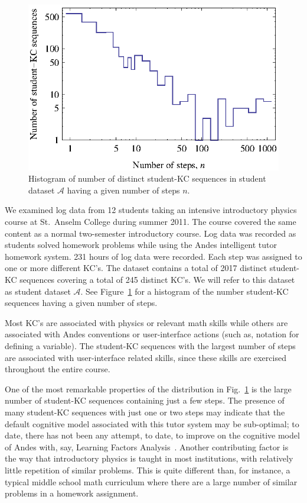 \documentclass{edm_template}
\begin{document}
\begin{figure}
  \centering \includegraphics{student-kc-length-histogram.eps}
  \caption{Histogram of number of distinct student-KC sequences in student 
    dataset $\mathcal{A}$ having a given number of steps $n$.}
    \label{student-length-histogram}
\end{figure}

We examined log data from 12 students taking an intensive introductory
physics course at St.\ Anselm College during summer 2011.  The course
covered the same content as a normal two-semester introductory course.
Log data was recorded as students solved homework problems while using
the Andes intelligent tutor homework system.  231 hours of log data
were recorded.
Each step was assigned to one or more different KC's.  The dataset
contains a total of 2017 distinct student-KC sequences covering a total of
245 distinct KC's.  We will refer to this dataset as student dataset
$\mathcal{A}$.  See Figure~\ref{student-length-histogram} for a
histogram of the number student-KC sequences having a given number of
steps.

Most KC's are associated with physics
or relevant math skills while others are associated with 
Andes conventions or user-interface actions (such as, notation
for defining a variable).  The student-KC sequences with the largest 
number of steps are associated with user-interface related skills,
since these skills are exercised throughout the entire course. 

One of the most remarkable properties of the distribution in
Fig.~\ref{student-length-histogram} is the large number of
student-KC sequences containing just a few steps.
The presence of many student-KC sequences with just one or two
steps may indicate that the default cognitive model associated 
with this tutor system may be sub-optimal; to date, there has not 
been any attempt, to date, to improve on the cognitive model of 
Andes with, say, Learning Factors Analysis~\cite{cen_learning_2006}.
Another contributing factor is the way that introductory physics is 
taught in most institutions, with relatively little repetition of 
similar problems.  This is quite different than, for instance, 
a typical middle school math curriculum where there are a large number
of similar problems in a homework assignment.
\end{document}
